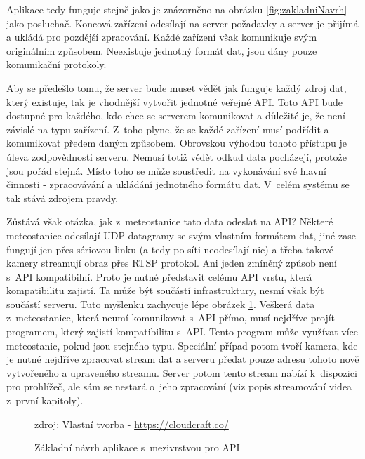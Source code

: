 Aplikace tedy funguje stejně jako je znázorněno na obrázku \ref{fig:zakladniNavrh} - jako posluchač. Koncová zařízení odesílají na server požadavky a server je přijímá a ukládá pro pozdější zpracování. Každé zařízení však komunikuje svým originálním způsobem. Neexistuje jednotný formát dat, jsou dány pouze komunikační protokoly.

Aby se předešlo tomu, že server bude muset vědět jak funguje každý zdroj dat, který existuje, tak je vhodnější vytvořit jednotné veřejné API. Toto API bude dostupné pro každého, kdo chce se serverem komunikovat a důležité je, že není závislé na typu zařízení. Z~toho plyne, že se každé zařízení musí podřídit a komunikovat předem daným způsobem. Obrovskou výhodou tohoto přístupu je úleva zodpovědnosti serveru. Nemusí totiž vědět odkud data pocházejí, protože jsou pořád stejná. Místo toho se může soustředit na vykonávání své hlavní činnosti - zpracovávání a ukládání jednotného formátu dat. V~celém systému se tak stává zdrojem pravdy.

Zůstává však otázka, jak z~meteostanice tato data odeslat na API? Ně\-kte\-ré meteostanice odesílají UDP datagramy se svým vlastním formátem dat, jiné zase fungují jen přes sériovou linku (a tedy po síti neodesílají nic) a třeba takové kamery streamují obraz přes RTSP protokol. Ani jeden zmíněný způsob není s~API kompatibilní. Proto je nutné představit celému API vrstu, která kompatibilitu zajistí. Ta může být součástí infrastruktury, nesmí však být součástí serveru. Tuto myšlenku zachycuje lépe obrázek \ref{fig:zakladniNavrh2}. Veškerá data z~meteostanice, která neumí komunikovat s~API přímo, musí nejdříve projít programem, který zajistí kompatibilitu s~API. Tento program může využívat více meteostanic, pokud jsou stejného typu. Speciální případ potom tvoří kamera, kde je nutné nejdříve zpracovat stream dat a serveru předat pouze adresu tohoto nově vytvořeného a upraveného streamu. Server potom tento stream nabízí k~dispozici pro prohlížeč, ale sám se nestará o~jeho zpracování (viz popis streamování videa z~první kapitoly).

\begin{figure}[h]
    \centering
	\caption{Základní návrh aplikace s~mezivrstvou pro API}
	\small zdroj: Vlastní tvorba - \url{https://cloudcraft.co/}
	\label{fig:zakladniNavrh2}
\end{figure}

